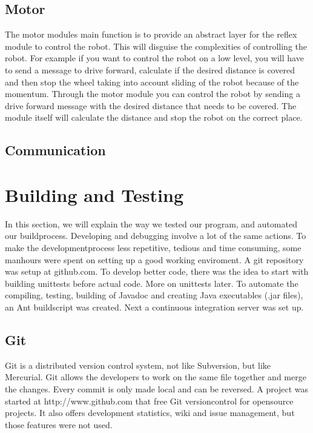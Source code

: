\documentclass[titlepage, a4paper,10pt]{article}
\begin{document}
\subsection{Motor}
The motor modules main function is to provide an abstract layer for the reflex module to control the robot. This will disguise the complexities of controlling the robot. For example if you want to control the robot on a low level, you will have to send a message to drive forward, calculate if the desired distance is covered and then stop the wheel taking into account sliding of the robot because of the momentum. Through the motor module you can control the robot by sending a drive forward message with the desired distance that needs to be covered. The module itself will calculate the distance and stop the robot on the correct place.


\subsection{Communication}


\newpage

\section{Building and Testing}
In this section, we will explain the way we tested our program, and automated our buildprocess. Developing and debugging involve a lot of the same actions. To make the developmentprocess less repetitive, tedious and time consuming, some manhours were spent on setting up a good working enviroment. A git repository was setup at github.com. To develop better code, there was the idea to start with building unittests before actual code. More on unittests later. To automate the compiling, testing, building of Javadoc and creating Java executables (.jar files), an Ant buildscript was created. Next a continuous integration server was set up.

\subsection{Git}
Git is a distributed version control system, not like Subversion, but like Mercurial. Git allows the developers to work on the same file together and merge the changes. Every commit is only made local and can be reversed. A project was started at http://www.github.com that free Git versioncontrol for opensource projects. It also offers development statistics, wiki and issue management, but those features were not used.
\end{document}
